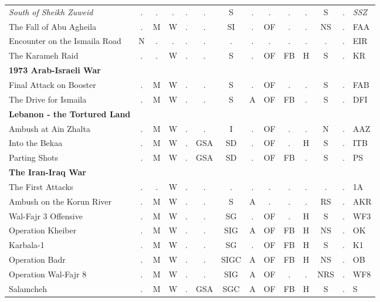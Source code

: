 \documentclass[a4paper]{article}
\newenvironment{texte}{\rmfamily\footnotesize}{}
\begin{document}
\begin{texte}
\begin{tabular}{lccccccccccccl}
\it  South of Sheikh Zuweid                        & . &  . &  . &  . &  .  & S  & . &  . &  . & . &  S & . & \it SSZ \\
     The Fall of Abu Agheila                       & . &  M &  W &  . &  .  & SI & . & OF &  . & . & NS & . &     FAA \\
     Encounter on the Ismaila Road                 & N &  . &  . &  . &  .  &  . & . &  . &  . & . &  . & . &     EIR \\
     The Karameh Raid                              & . &  . &  W &  . &  .  & S  & . & OF & FB & H &  S & . &     KR  \\

\bf 1973 Arab-Israeli War \\

     Final Attack on Booster                       & . &  M &  W &  . &  .  & S  & . & OF &  . & . &  S & . &     FAB \\
     The Drive for Ismaila                         & . &  M &  W &  . &  .  & S  & A & OF & FB & . &  S & . &     DFI \\

\bf Lebanon - the Tortured Land \\

     Ambush at Ain Zhalta                          & . &  M &  W &  . &  .  & I    & . & OF &  . & . &  N & . &      AAZ \\
     Into the Bekaa                                & . &  M &  W &  . & GSA & SD   & . & OF &  . & H &  S & . &      ITB \\
     Parting Shots                                 & . &  M &  W &  . & GSA & SD   & . & OF & FB & . &  S & . &      PS  \\

\bf The Iran-Iraq War \\

     The First Attacks                             & . &  . &  W &  . &  .  &  .   & . &  . &  . & . &  .  & . &     1A  \\
     Ambush on the Korun River                     & . &  M &  W &  . &  .  & S    & A &  . &  . & . & RS  & . &     AKR \\
     Wal-Fajr 3 Offensive                          & . &  M &  W &  . &  .  & SG   & . & OF &  . & H &  S  & . &     WF3 \\
     Operation Kheiber                             & . &  M &  W &  . &  .  & SIG  & A & OF & FB & H & NS  & . &     OK  \\
     Karbala-1                                     & . &  M &  W &  . &  .  & SG   & . & OF & FB & H &  S  & . &     K1  \\
     Operation Badr                                & . &  M &  W &  . &  .  & SIGC & A & OF & FB & H & NS  & . &     OB  \\
     Operation Wal-Fajr 8                          & . &  M &  W &  . &  .  & SIG  & A & OF &  . & . & NRS & . &     WF8 \\
     Salamcheh                                     & . &  M &  W &  . & GSA & SGC  & A & OF & FB & H &  S  & . &     S   \\


\end{tabular}
\end{texte}
\end{document}
